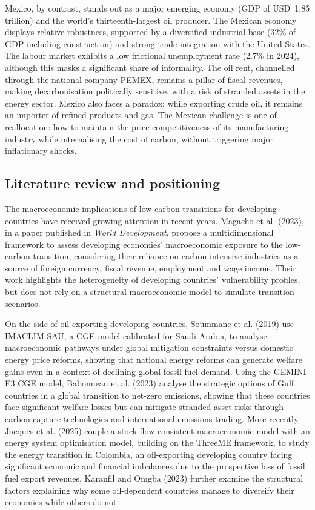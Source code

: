 \documentclass[12pt, a4paper]{article}
\begin{document}
Mexico, by contrast, stands out as a major emerging economy (GDP of USD~1.85 trillion) and the world's thirteenth-largest oil producer. The Mexican economy displays relative robustness, supported by a diversified industrial base (32\% of GDP including construction) and strong trade integration with the United States. The labour market exhibits a low frictional unemployment rate (2.7\% in 2024), although this masks a significant share of informality. The oil rent, channelled through the national company PEMEX, remains a pillar of fiscal revenues, making decarbonisation politically sensitive, with a risk of stranded assets in the energy sector. Mexico also faces a paradox: while exporting crude oil, it remains an importer of refined products and gas. The Mexican challenge is one of reallocation: how to maintain the price competitiveness of its manufacturing industry while internalising the cost of carbon, without triggering major inflationary shocks.

\subsection{Literature review and positioning}

The macroeconomic implications of low-carbon transitions for developing countries have received growing attention in recent years. Magacho et al. (2023), in a paper published in \textit{World Development}, propose a multidimensional framework to assess developing economies' macroeconomic exposure to the low-carbon transition, considering their reliance on carbon-intensive industries as a source of foreign currency, fiscal revenue, employment and wage income. Their work highlights the heterogeneity of developing countries' vulnerability profiles, but does not rely on a structural macroeconomic model to simulate transition scenarios.

On the side of oil-exporting developing countries, Soummane et al. (2019) use IMACLIM-SAU, a CGE model calibrated for Saudi Arabia, to analyse macroeconomic pathways under global mitigation constraints versus domestic energy price reforms, showing that national energy reforms can generate welfare gains even in a context of declining global fossil fuel demand. Using the GEMINI-E3 CGE model, Babonneau et al. (2023) analyse the strategic options of Gulf countries in a global transition to net-zero emissions, showing that these countries face significant welfare losses but can mitigate stranded asset risks through carbon capture technologies and international emissions trading. More recently, Jacques et al. (2025) couple a stock-flow consistent macroeconomic model with an energy system optimisation model, building on the ThreeME framework, to study the energy transition in Colombia, an oil-exporting developing country facing significant economic and financial imbalances due to the prospective loss of fossil fuel export revenues. Karanfil and Omgba (2023) further examine the structural factors explaining why some oil-dependent countries manage to diversify their economies while others do not.
\end{document}
